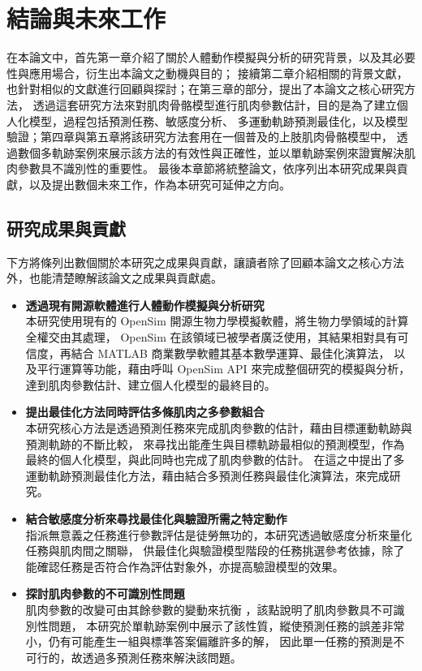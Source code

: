 \chapter{結論與未來工作}
\fontsize{12pt}{18pt}\selectfont

在本論文中，首先第一章介紹了關於人體動作模擬與分析的研究背景，以及其必要性與應用場合，衍生出本論文之動機與目的；
接續第二章介紹相關的背景文獻，也針對相似的文獻進行回顧與探討；在第三章的部分，提出了本論文之核心研究方法，
透過這套研究方法來對肌肉骨骼模型進行肌肉參數估計，目的是為了建立個人化模型，過程包括預測任務、敏感度分析、
多運動軌跡預測最佳化，以及模型驗證；第四章與第五章將該研究方法套用在一個普及的上肢肌肉骨骼模型中，
透過數個多軌跡案例來展示該方法的有效性與正確性，並以單軌跡案例來證實解決肌肉參數具不識別性的重要性。
最後本章節將統整論文，依序列出本研究成果與貢獻，以及提出數個未來工作，作為本研究可延伸之方向。

\section{研究成果與貢獻}
下方將條列出數個關於本研究之成果與貢獻，讓讀者除了回顧本論文之核心方法外，也能清楚瞭解該論文之成果與貢獻處。

\begin{itemize}
    \item \textbf{透過現有開源軟體進行人體動作模擬與分析研究}
    \\ 本研究使用現有的 OpenSim 開源生物力學模擬軟體，將生物力學領域的計算全權交由其處理，
    OpenSim 在該領域已被學者廣泛使用，其結果相對具有可信度，再結合 MATLAB 商業數學軟體其基本數學運算、最佳化演算法，
    以及平行運算等功能，藉由呼叫 OpenSim API 來完成整個研究的模擬與分析，達到肌肉參數估計、建立個人化模型的最終目的。
    \clearpage
    \item \textbf{提出最佳化方法同時評估多條肌肉之多參數組合}
    \\ 本研究核心方法是透過預測任務來完成肌肉參數的估計，藉由目標運動軌跡與預測軌跡的不斷比較，
    來尋找出能產生與目標軌跡最相似的預測模型，作為最終的個人化模型，與此同時也完成了肌肉參數的估計。
    在這之中提出了多運動軌跡預測最佳化方法，藉由結合多預測任務與最佳化演算法，來完成研究。
    \item \textbf{結合敏感度分析來尋找最佳化與驗證所需之特定動作}
    \\ 指派無意義之任務進行參數評估是徒勞無功的，本研究透過敏感度分析來量化任務與肌肉間之關聯，
    供最佳化與驗證模型階段的任務挑選參考依據，除了能確認任務是否符合作為評估對象外，亦提高驗證模型的效果。
    \item \textbf{探討肌肉參數的不可識別性問題}
    \\ 肌肉參數的改變可由其餘參數的變動來抗衡 \cite{bujalski2018monte}，該點說明了肌肉參數具不可識別性問題，
    本研究於單軌跡案例中展示了該性質，縱使預測任務的誤差非常小，仍有可能產生一組與標準答案偏離許多的解，
    因此單一任務的預測是不可行的，故透過多預測任務來解決該問題。
\end{itemize}

